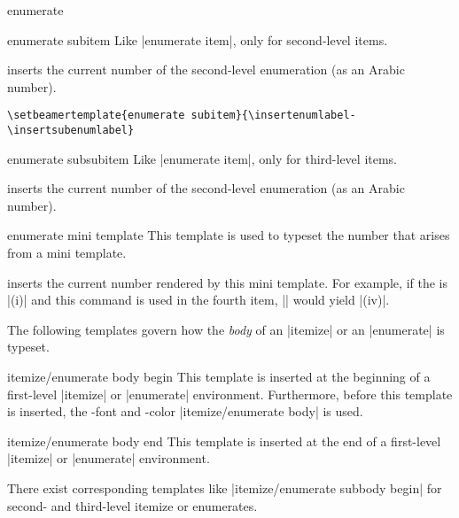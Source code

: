 \begin{environment}{{enumerate}}
  \begin{element}{enumerate subitem}\yes\yes\yes
    Like |enumerate item|, only for second-level items.

    \begin{templateinserts}
      \iteminsert{\insertsubenumlabel}
      inserts the current number of the second-level enumeration (as an
      Arabic number).
    \end{templateinserts}

    \example
\begin{verbatim}
\setbeamertemplate{enumerate subitem}{\insertenumlabel-\insertsubenumlabel}
\end{verbatim}
  \end{element}

  \begin{element}{enumerate subsubitem}\yes\yes\yes
    Like |enumerate item|, only for third-level items.

    \begin{templateinserts}
      \iteminsert{\insertsubsubenumlabel}
      inserts the current number of the second-level enumeration (as an
      Arabic number).
    \end{templateinserts}
  \end{element}

  \begin{element}{enumerate mini template}\yes\yes\yes
    This template is used to typeset the number that arises from a
    mini template.

    \begin{templateinserts}
      \iteminsert{\insertenumlabel}
      inserts the current number rendered by this mini template. For
      example, if the  is |(i)| and this command
      is used in the fourth item, |\insertenumlabel| would yield
      |(iv)|.
    \end{templateinserts}
  \end{element}
\end{environment}

The following templates govern how the \emph{body} of an |itemize| or
an |enumerate| is typeset.
\begin{element}{itemize/enumerate body begin}\yes\no\no
  This template is inserted at the beginning of a first-level
  |itemize| or |enumerate| environment. Furthermore, before this
  template is inserted, the \beamer-font and -color
  |itemize/enumerate body| is used.
\end{element}
\begin{element}{itemize/enumerate body end}\yes\no\no
  This template is inserted at the end of a first-level
  |itemize| or |enumerate| environment.
\end{element}
There exist corresponding templates like
|itemize/enumerate subbody begin| for second- and third-level itemize
or enumerates.


